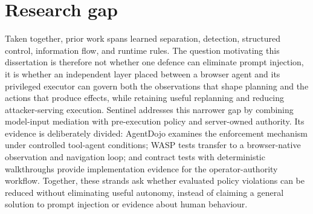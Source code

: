 \section{Research gap}

Taken together, prior work spans learned separation, detection, structured
control, information flow, and runtime rules. The question motivating this
dissertation is therefore not whether one defence can eliminate prompt
injection, it is whether an independent layer placed between a browser agent
and its privileged executor can govern both the observations that shape
planning and the actions that produce effects, while retaining useful
replanning and reducing attacker-serving execution. Sentinel addresses this
narrower gap by combining model-input
mediation with pre-execution policy and server-owned authority. Its evidence is
deliberately divided: AgentDojo examines the enforcement mechanism under
controlled tool-agent conditions; WASP tests transfer to a browser-native
observation and navigation loop; and contract tests with deterministic
walkthroughs provide implementation evidence for the operator-authority
workflow. Together, these strands ask whether evaluated policy violations can
be reduced without eliminating useful autonomy, instead of claiming a general
solution to prompt injection or evidence about human behaviour.

